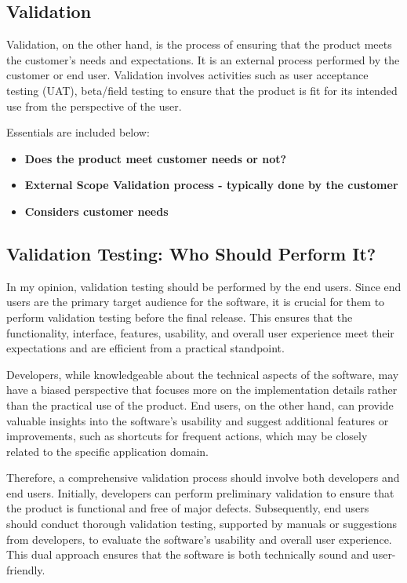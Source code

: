 \documentclass[12pt,a4paper]{article}
\begin{document}
\subsection{Validation}
Validation, on the other hand, is the process of ensuring that the product meets the customer's needs and expectations. It is an external process performed by the customer or end user. Validation involves activities such as user acceptance testing (UAT), beta/field testing to ensure that the product is fit for its intended use from the perspective of the user.

Essentials are included below:

\begin{itemize}
    \item \textbf{Does the product meet customer needs or not?}
    \item \textbf{External Scope Validation process - typically done by the customer}
    \item \textbf{Considers customer needs}
\end{itemize}

\subsection{Validation Testing: Who Should Perform It?}
In my opinion, validation testing should be performed by the end users. Since end users are the primary target audience for the software, it is crucial for them to perform validation testing before the final release. This ensures that the functionality, interface, features, usability, and overall user experience meet their expectations and are efficient from a practical standpoint.

Developers, while knowledgeable about the technical aspects of the software, may have a biased perspective that focuses more on the implementation details rather than the practical use of the product. End users, on the other hand, can provide valuable insights into the software's usability and suggest additional features or improvements, such as shortcuts for frequent actions, which may be closely related to the specific application domain.

Therefore, a comprehensive validation process should involve both developers and end users. Initially, developers can perform preliminary validation to ensure that the product is functional and free of major defects. Subsequently, end users should conduct thorough validation testing, supported by manuals or suggestions from developers, to evaluate the software's usability and overall user experience. This dual approach ensures that the software is both technically sound and user-friendly.
\end{document}
